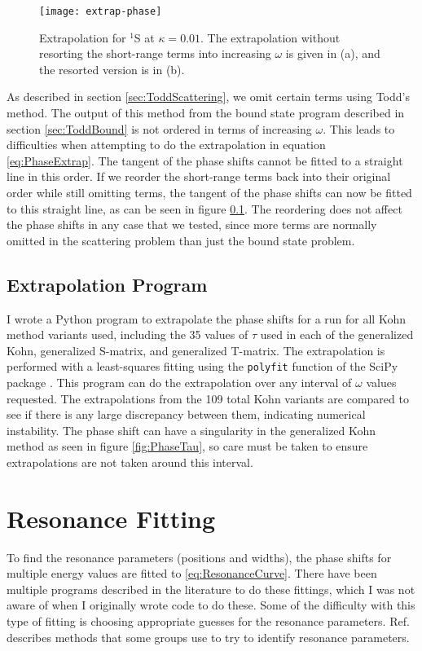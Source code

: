 \documentclass[Dissertation.tex]{subfiles}
\begin{document}
\begin{figure}[H]
	\centering
	\texttt{[image: extrap-phase]}
	\caption{Extrapolation for $^1$S at $\kappa = 0.01$. The extrapolation without resorting the short-range terms into increasing $\omega$ is given in (a), and the resorted version is in (b).}
	\label{fig:extrap-phase}
\end{figure}

As described in section \ref{sec:ToddScattering}, we omit certain terms using Todd's method. The output of this method from the bound state program described in section \ref{sec:ToddBound} is not ordered in terms of increasing $\omega$. This leads to difficulties when attempting to do the extrapolation in equation \ref{eq:PhaseExtrap}. The tangent of the phase shifts cannot be fitted to a straight line in this order. If we reorder the short-range terms back into their original order while still omitting terms, the tangent of the phase shifts can now be fitted to this straight line, as can be seen in figure \ref{}. The reordering does not affect the phase shifts in any case that we tested, since more terms are normally omitted in the scattering problem than just the bound state problem.

\subsection{Extrapolation Program}
I wrote a Python \cite{Python} program to extrapolate the phase shifts for a run for all Kohn method variants used, including the 35 values of $\tau$ used in each of the generalized Kohn, generalized S-matrix, and generalized T-matrix. The extrapolation is performed with a least-squares fitting using the \texttt{polyfit} function of the SciPy package \cite{SciPy}. This program can do the extrapolation over any interval of $\omega$ values requested. The extrapolations from the 109 total Kohn variants are compared to see if there is any large discrepancy between them, indicating numerical instability. The phase shift can have a singularity in the generalized Kohn method as seen in figure \ref{fig:PhaseTau}, so care must be taken to ensure extrapolations are not taken around this interval.



\section{Resonance Fitting}
\label{sec:ResonanceFit}

To find the resonance parameters (positions and widths), the phase shifts for multiple energy values are fitted to \cref{eq:ResonanceCurve}. There have been multiple programs described in the literature \cite{Tennyson1984, Stibbe1998, Sochi2013} to do these fittings, which I was not aware of when I originally wrote code to do these. Some of the difficulty with this type of fitting is choosing appropriate guesses for the resonance parameters. Ref.~\cite{Sochi2013} describes methods that some groups use to try to identify resonance parameters.
\end{document}
